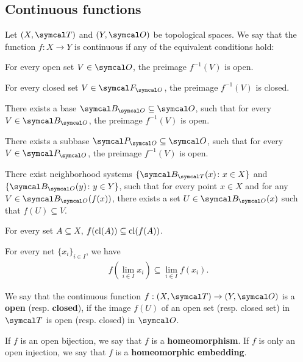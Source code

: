 \subsection{Continuous functions}\label{sec:continuous_functions}

\begin{definition}\label{def:continuous_function}
  Let \( (X, \Cal{T}) \) and \( (Y, \Cal{O}) \) be topological spaces. We say that the function \( f: X \to Y \) is continuous if any of the equivalent conditions hold:
  \begin{defenum}
    \item\label{def:continuous_function/direct} For every open set \( V \in \Cal{O} \), the preimage \( f^{-1}(V) \) is open.
    \item\label{def:continuous_function/closed} For every closed set \( V \in \Cal{F}_{\Cal{O}} \), the preimage \( f^{-1}(V) \) is closed.
    \item\label{def:continuous_function/base} There exists a base \( \Cal{B}_{\Cal{O}} \subseteq \Cal{O} \), such that for every \( V \in \Cal{B}_{\Cal{O}} \), the preimage \( f^{-1}(V) \) is open.
    \item\label{def:continuous_function/subbase} There exists a subbase \( \Cal{P}_{\Cal{O}} \subseteq \Cal{O} \), such that for every \( V \in \Cal{P}_{\Cal{O}} \), the preimage \( f^{-1}(V) \) is open.
    \item\label{def:continuous_function/local_base} There exist neighborhood systems \( \{ \Cal{B}_{\Cal{T}}(x) \colon x \in X \} \) and \( \{ \Cal{B}_{\Cal{O}}(y) \colon y \in Y \} \), such that for every point \( x \in X \) and for any \( V \in \Cal{B}_{\Cal{O}}(f(x)) \), there exists a set \( U \in \Cal{B}_{\Cal{O}}(x) \) such that \( f(U) \subseteq V \).
    \item\label{def:continuous_function/closure} For every set \( A \subseteq X \), \( f(\operatorname{cl}(A)) \subseteq \operatorname{cl}(f(A)) \).
    \item\label{def:continuous_function/limits} For every net \( \{ x_i \}_{i \in I} \), we have
    \begin{align*}
      f\left(\lim_{i \in I} x_i \right) \subseteq \lim_{i \in I} f(x_i).
    \end{align*}
  \end{defenum}
\end{definition}

\begin{definition}\label{def:homeomorphism}
  We say that the continuous function \( f: (X, \Cal{T}) \to (Y, \Cal{O}) \) is a \textbf{open} (resp. \textbf{closed}), if the image \( f(U) \) of an open set (resp. closed set) in \( \Cal{T} \) is open (resp. closed) in \( \Cal{O} \).

  If \( f \) is an open bijection, we say that \( f \) is a \textbf{homeomorphism}. If \( f \) is only an open injection, we say that \( f \) is a \textbf{homeomorphic embedding}.
\end{definition}
